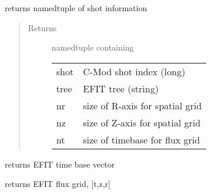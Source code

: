 \documentclass[letterpaper,10pt,english]{sphinxmanual}
\begin{document}
\begin{fulllineitems}
\begin{fulllineitems}
\end{fulllineitems}


\begin{fulllineitems}
\label{eqtools:eqtools.EFIT.EFITTree.getInfo}
returns namedtuple of shot information
\begin{quote}\begin{description}
\item[{Returns}] \leavevmode

namedtuple containing

\begin{tabulary}{\linewidth}{|L|L|}
\hline

shot
 & 
C-Mod shot index (long)
\\

tree
 & 
EFIT tree (string)
\\

nr
 & 
size of R-axis for spatial grid
\\

nz
 & 
size of Z-axis for spatial grid
\\

nt
 & 
size of timebase for flux grid
\\
\hline\end{tabulary}



\end{description}\end{quote}

\end{fulllineitems}


\begin{fulllineitems}
\label{eqtools:eqtools.EFIT.EFITTree.getTimeBase}
returns EFIT time base vector

\end{fulllineitems}


\begin{fulllineitems}
\label{eqtools:eqtools.EFIT.EFITTree.getFluxGrid}
returns EFIT flux grid, {[}t,z,r{]}

\end{fulllineitems}


\end{fulllineitems}
\end{document}
